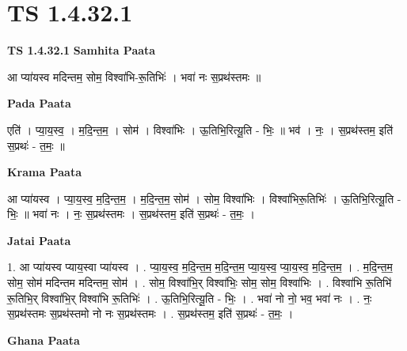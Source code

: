 \documentclass[17pt]{extarticle}
\begin{document}
\section{ TS 1.4.32.1 }

\textbf{TS 1.4.32.1 } \newline
\textbf{Samhita Paata} \newline

आ प्या॑यस्व मदिन्तम॒ सोम॒ विश्वा॑भि-रू॒तिभिः॑ । भवा॑ नः स॒प्रथ॑स्तमः ॥ \newline

\textbf{Pada Paata} \newline

एति॑ । प्या॒य॒स्व॒ । म॒दि॒न्त॒म॒ । सोम॑ । विश्वा॑भिः । ऊ॒तिभि॒रित्यू॒ति - भिः॒ ॥ भव॑ । नः॒ । स॒प्रथ॑स्तम॒ इति॑ स॒प्रथः॑ - त॒मः॒ ॥  \newline


\textbf{Krama Paata} \newline

आ प्या॑यस्व । प्या॒य॒स्व॒ म॒दि॒न्त॒म॒ । म॒दि॒न्त॒म॒ सोम॑ । सोम॒ विश्वा॑भिः । विश्वा॑भिरू॒तिभिः॑ । ऊ॒तिभि॒रित्यू॒ति - भिः॒ ॥ भवा॑ नः । नः॒ स॒प्रथ॑स्तमः । स॒प्रथ॑स्तम॒ इति॑ स॒प्रथः॑ - त॒मः॒ । \newline

\textbf{Jatai Paata} \newline

1. आ प्या॑यस्व प्याय॒स्वा प्या॑यस्व । . प्या॒य॒स्व॒ म॒दि॒न्त॒म॒ म॒दि॒न्त॒म॒ प्या॒य॒स्व॒ प्या॒य॒स्व॒ म॒दि॒न्त॒म॒ । . म॒दि॒न्त॒म॒ सोम॒ सोम॑ मदिन्तम मदिन्तम॒ सोम॑ । . सोम॒ विश्वा॑भि॒र् विश्वा॑भिः॒ सोम॒ सोम॒ विश्वा॑भिः । . विश्वा॑भि रू॒तिभि॑ रू॒तिभि॒र् विश्वा॑भि॒र् विश्वा॑भि रू॒तिभिः॑ । . ऊ॒तिभि॒रित्यू॒ति - भिः॒ । . भवा॑ नो नो॒ भव॒ भवा॑ नः । . नः॒ स॒प्रथ॑स्तमः स॒प्रथ॑स्तमो नो नः स॒प्रथ॑स्तमः । . स॒प्रथ॑स्तम॒ इति॑ स॒प्रथः॑ - त॒मः॒ । \newline

\textbf{Ghana Paata } \newline
\end{document}
